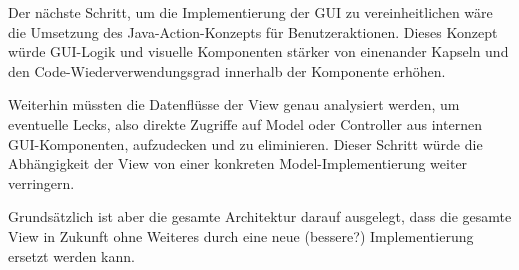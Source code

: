     Der nächste Schritt, um die Implementierung der GUI zu vereinheitlichen wäre
    die Umsetzung des Java-Action-Konzepts für Benutzeraktionen. Dieses Konzept
    würde GUI-Logik und visuelle Komponenten stärker von einenander Kapseln und
    den Code-Wiederverwendungsgrad innerhalb der Komponente erhöhen.
    
    Weiterhin müssten die Datenflüsse der View genau analysiert werden, um
    eventuelle Lecks, also direkte Zugriffe auf Model oder Controller aus
    internen GUI-Komponenten, aufzudecken und zu eliminieren. Dieser Schritt
    würde die Abhängigkeit der View von einer konkreten Model-Implementierung
    weiter verringern.

    Grundsätzlich ist aber die gesamte Architektur darauf ausgelegt, dass die
    gesamte View in Zukunft ohne Weiteres durch eine neue (bessere?)
    Implementierung ersetzt werden kann.

